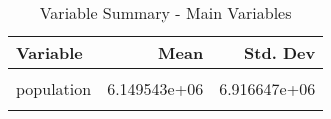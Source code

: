 \begin{table}[H]

\caption{\label{tab:tab:main_variables}Variable Summary - Main Variables}
\centering
\begin{tabular}[t]{lrr}
\toprule
Variable & Mean & Std. Dev\\
\midrule
\cellcolor{gray!6}{deaths} & \cellcolor{gray!6}{9.196637e+02} & \cellcolor{gray!6}{9.815185e+02}\\
population & 6.149543e+06 & 6.916647e+06\\
\cellcolor{gray!6}{crude\_death\_rate} & \cellcolor{gray!6}{1.559731e+01} & \cellcolor{gray!6}{7.211380e+00}\\
\bottomrule
\end{tabular}
\end{table}
